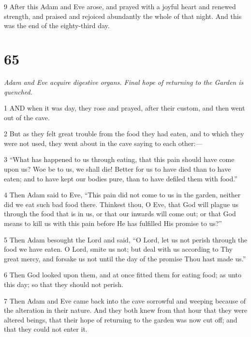 \par 9 After this Adam and Eve arose, and prayed with a joyful heart and renewed strength, and praised and rejoiced abundantly the whole of that night. And this was the end of the eighty-third day.

\chapter{65}

\par \textit{Adam and Eve acquire digestive organs. Final hope of returning to the Garden is quenched.}

\par 1 AND when it was day, they rose and prayed, after their custom, and then went out of the cave.

\par 2 But as they felt great trouble from the food they had eaten, and to which they were not used, they went about in the cave saying to each other:—

\par 3 “What has happened to us through eating, that this pain should have come upon us? Woe be to us, we shall die! Better for us to have died than to have eaten; and to have kept our bodies pure, than to have defiled them with food.”

\par 4 Then Adam said to Eve, “This pain did not come to us in the garden, neither did we eat such bad food there. Thinkest thou, O Eve, that God will plague us through the food that is in us, or that our inwards will come out; or that God means to kill us with this pain before He has fulfilled His promise to us?”

\par 5 Then Adam besought the Lord and said, “O Lord, let us not perish through the food we have eaten. O Lord, smite us not; but deal with us according to Thy great mercy, and forsake us not until the day of the promise Thou hast made us.”

\par 6 Then God looked upon them, and at once fitted them for eating food; as unto this day; so that they should not perish.

\par 7 Then Adam and Eve came back into the cave sorrowful and weeping because of the alteration in their nature. And they both knew from that hour that they were altered beings, that their hope of returning to the garden was now cut off; and that they could not enter it.

